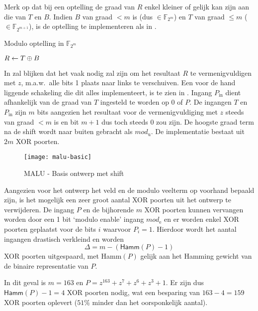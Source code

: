 Merk op dat bij een optelling de graad van $R$ enkel kleiner of gelijk kan zijn aan die van $T$ en $B$. Indien $B$ van graad $< m$ is (dus $\in \mathbb{F}_{2^m}$) en $T$ van graad $\leq m$ ($\in \mathbb{F}_{2^{m+1}}$), is de optelling te implementeren als in .

\begin{algorithm}[h]
	\caption{Modulo optelling in $\mathbb{F}_{2^m}$}
	\label{algoritme-implementatie-malu-modulo}

	$R \leftarrow T \oplus B$\;

\end{algorithm}

In  zal blijken dat het vaak nodig zal zijn om het resultaat $R$ te vermenigvuldigen met $z$, m.a.w.\ alle bits 1 plaats naar links te verschuiven. Een voor de hand liggende schakeling die dit alles implementeert, is te zien in . Ingang $P_{\text{in}}$ dient afhankelijk van de graad van $T$ ingesteld te worden op $0$ of $P$. De ingangen $T$ en $P_{\text{in}}$ zijn $m$ bits aangezien het resultaat voor de vermenigvuldiging met $z$ steeds van graad $< m$ is en bit $m + 1$ dus toch steeds 0 zou zijn. De hoogste graad term na de shift wordt naar buiten gebracht als $mod_{\text{u}}$. De implementatie bestaat uit $2m$ XOR poorten.

\begin{figure}[h]
	\centering
		\texttt{[image: malu-basic]}
		\caption{MALU - Basis ontwerp met shift\label{figuur-implementatie-malu-basic}}
\end{figure}

Aangezien voor het ontwerp het veld en de modulo veelterm op voorhand bepaald zijn, is het mogelijk een zeer groot aantal XOR poorten uit het ontwerp te verwijderen. De ingang $P$ en de bijhorende $m$ XOR poorten kunnen vervangen worden door een 1 bit `modulo enable' ingang $mod_{\text{e}}$ en er worden enkel XOR poorten geplaatst voor de bits $i$ waarvoor $P_i = 1$. Hierdoor wordt het aantal ingangen drastisch verkleind en worden 
\[\Delta = m - (\textsf{Hamm}(P) - 1)\]
XOR poorten uitgespaard, met \textsf{Hamm}$(P)$ gelijk aan het Hamming gewicht van de binaire representatie van $P$.

In dit geval is $m = 163$ en $P = z^{163} + z^7 + z^6 + z^3 + 1$. Er zijn dus $\textsf{Hamm}(P) - 1 = 4$ XOR poorten nodig, wat een besparing van $163 - 4 =  159$ XOR poorten oplevert ($51\%$ minder dan het oorsponkelijk aantal).

